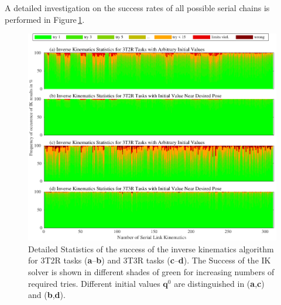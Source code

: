 \documentclass[robotics,article,accept,moreauthors,pdftex]{Definitions/mdpi}
\newcommand{\bm}[1]{\boldsymbol{#1}}
\begin{document}
A detailed investigation on the success rates of all possible serial chains is performed in Figure\,\ref{fig:serrob_ik_hist}.

\begin{figure}[H]
    \includegraphics{serrob_ik_hist_all.pdf}
    \caption{Detailed Statistics of the success of the inverse kinematics algorithm for 3T2R tasks (\textbf{a}--\textbf{b}) and 3T3R tasks (\textbf{c}--\textbf{d}). The Success of the IK solver is shown in different shades of green for increasing numbers of required tries. Different initial values $\bm{q}^0$ are distinguished in (\textbf{a},\textbf{c}) and (\textbf{b},\textbf{d}).}
    \label{fig:serrob_ik_hist}
\end{figure} 
\end{document}
